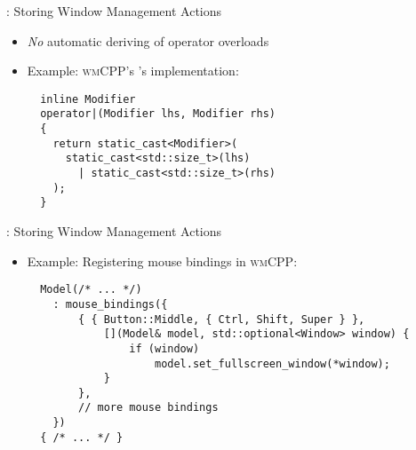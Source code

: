 \begin{frame}[fragile]{\underline{\cpp}: Storing Window Management Actions \hfill {\footnotesize \currentname}}


    \begin{itemize}

        \item \textit{No} automatic deriving of operator overloads

        \item Example: \textsc{wmCPP}'s 's  implementation:\\[3pt] 
\begin{verbatim}
  inline Modifier
  operator|(Modifier lhs, Modifier rhs)
  {
    return static_cast<Modifier>(
      static_cast<std::size_t>(lhs)
        | static_cast<std::size_t>(rhs)
    );
  }
\end{verbatim}

    \end{itemize}

    \vfill

\end{frame}

\begin{frame}[fragile]{\underline{\cpp}: Storing Window Management Actions \hfill {\footnotesize \currentname}}


    \begin{itemize}

        \item Example: Registering mouse bindings in \textsc{wmCPP}:\\[3pt] 
\begin{verbatim}
  Model(/* ... */)
    : mouse_bindings({
        { { Button::Middle, { Ctrl, Shift, Super } },
            [](Model& model, std::optional<Window> window) {
                if (window)
                    model.set_fullscreen_window(*window);
            }
        },
        // more mouse bindings
    })
  { /* ... */ }
\end{verbatim}

    \end{itemize}

    \vfill

\end{frame}



